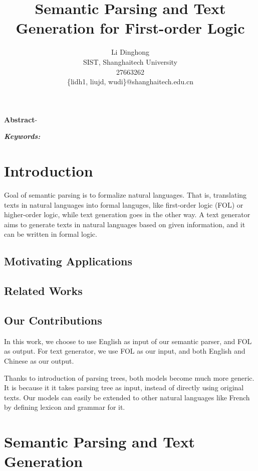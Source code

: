 \documentclass{article}
\title{Semantic Parsing and Text Generation for First-order Logic}
\author{
	Li Dinghong\\
	SIST, Shanghaitech University\\
	27663262\\
	\{lidh1, liujd, wudi\}@shanghaitech.edu.cn
}
\begin{document}
{
	\newpage
	\maketitle

	\textbf{Abstract}-{}

	\vspace{5pt}
	\textbf{\emph{Keywords:}} {}

	\tableofcontents
}

\section{Introduction}{
	Goal of semantic parsing is to formalize natural languages. That is, translating texts in natural languages into formal languges, like first-order logic (FOL) or higher-order logic, while text generation goes in the other way. A text generator aims to generate texts in natural languages based on given information, and it can be written in formal logic. 

	\subsection{Motivating Applications}{
		\cite{su} 
	}

	\subsection{Related Works}{}

	\subsection{Our Contributions}{
		In this work, we choose to use English as input of our semantic parser, and FOL as output. For text generator, we use FOL as our input, and both English and Chinese as our output. 


		Thanks to introduction of parsing trees, both models become much more generic. It is because it it takes parsing tree as input, instead of directly using original texts. Our models can easily be extended to other natural languages like French by defining lexicon and grammar for it.  
	}
}

\section{Semantic Parsing and Text Generation}{}
\end{document}
